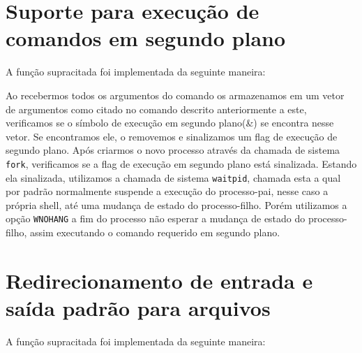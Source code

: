 \documentclass[12pt]{article}
\begin{document}
\section*{Suporte para execução de comandos em segundo plano}
A função supracitada foi implementada da seguinte maneira:

Ao recebermos todos os argumentos do comando os armazenamos em um vetor de argumentos como citado no comando descrito anteriormente a este, verificamos se o símbolo de execução em segundo plano(\&) se encontra nesse vetor.
Se encontramos ele, o removemos e sinalizamos um flag de execução de segundo plano.
Após criarmos o novo processo através da chamada de sistema \texttt{fork},
verificamos se a flag de execução em segundo plano está sinalizada.
Estando ela sinalizada, utilizamos a chamada de sistema \texttt{waitpid},
chamada esta a qual por padrão normalmente suspende a execução do processo-pai,
nesse caso a própria shell, até uma mudança de estado do processo-filho.
Porém utilizamos a opção \texttt{WNOHANG} a fim do processo não esperar
a mudança de estado do processo-filho, assim executando o comando requerido em segundo plano.

\section{Redirecionamento de entrada e saída padrão para arquivos}
A função supracitada foi implementada da seguinte maneira:




%

\end{document}
